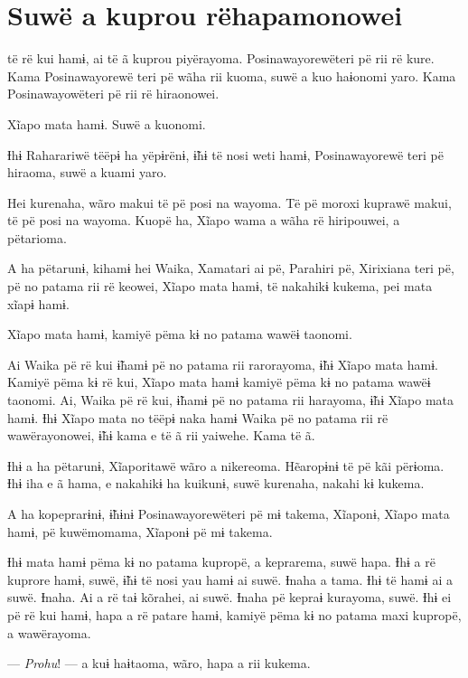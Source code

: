 \chapter[Suwë a kuprou rë hapamonowei]{Suwë a kuprou rë\break hapamonowei}


 të rë kui hamɨ, ai të ã kuprou piyërayoma. Posinawayorewëteri pë rii
rë kure. Kama Posinawayorewë teri pë wãha rii kuoma, suwë a kuo haɨonomi
yaro. Kama Posinawayowëteri pë rii rë hiraonowei. 

Xĩapo mata hamɨ. Suwë a kuonomi. 

Ɨhɨ Raharariwë tëëpɨ ha yëpɨrënɨ, ɨ̃hɨ të nosi weti hamɨ, Posinawayorewë
teri pë hiraoma, suwë a kuami yaro. 

Hei kurenaha, wãro makui të pë posi na wayoma. Të pë moroxi kuprawë
makui, të pë posi na wayoma. Kuopë ha, Xĩapo wama a wãha rë hiripouwei,
a pëtarioma. 

A ha pëtarunɨ, kihamɨ hei Waika, Xamatari ai pë, Parahiri pë, Xirixiana
teri pë, pë no patama rii rë keowei, Xĩapo mata hamɨ, të nakahikɨ
kukema, pei mata xĩapɨ hamɨ. 

Xĩapo mata hamɨ, kamiyë pëma kɨ no patama wawëɨ taonomi. 

Ai Waika pë rë kui ɨ̃hamɨ pë no patama rii rarorayoma, ɨ̃hɨ Xĩapo mata
hamɨ. Kamiyë pëma kɨ rë kui, Xĩapo mata hamɨ kamiyë pëma kɨ no patama
wawëɨ taonomi. Ai, Waika pë rë kui, ɨ̃hamɨ pë no patama rii harayoma, ɨ̃hɨ
Xĩapo mata hamɨ. Ɨhɨ Xĩapo mata no tëëpɨ naka hamɨ Waika pë no patama
rii rë wawërayonowei, ɨ̃hɨ kama e të ã rii yaiwehe. Kama të ã. 

Ɨhɨ a ha pëtarunɨ, Xĩaporitawë wãro a nikereoma. Hẽaropɨnɨ të pë kãi
përɨoma. Ɨhɨ iha e ã hama, e nakahikɨ ha kuikunɨ, suwë kurenaha, nakahi
kɨ kukema. 

A ha kopeprarɨnɨ, ɨ̃hɨnɨ Posinawayorewëteri pë mɨ takema, Xĩaponɨ, Xĩapo
mata hamɨ, pë kuwëmomama, Xĩaponɨ pë mɨ takema. 

Ɨhɨ mata hamɨ pëma kɨ no patama kupropë, a keprarema, suwë hapa. Ɨhɨ a
rë kuprore hamɨ, suwë, ɨ̃hɨ të nosi yau hamɨ ai suwë. Ɨnaha a tama. Ɨhɨ
të hamɨ ai a suwë. Ɨnaha. Ai a rë taɨ kõrahei, ai suwë. Ɨnaha pë kepraɨ
kurayoma, suwë. Ɨhɨ ei pë rë kui hamɨ, hapa a rë patare hamɨ, kamiyë
pëma kɨ no patama maxi kupropë, a wawërayoma. 

--- \textit{Prohu}! --- a kuɨ haɨtaoma, wãro, hapa a rii kukema. 

